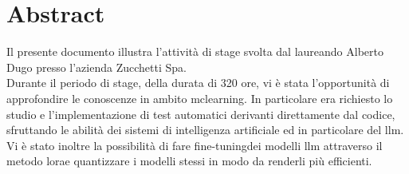 \cleardoublepage
{}
{}
\begingroup
\let\clearpage\relax
\let\cleardoublepage\relax
\chapter*{Abstract}
Il presente documento illustra l'attività di stage svolta dal laureando Alberto Dugo presso l'azienda Zucchetti Spa.
\\Durante il periodo di stage, della durata di 320 ore, vi è stata l'opportunità di approfondire le conoscenze in ambito \gls{mclearning}\glox.
In particolare era richiesto lo studio e l'implementazione di test automatici derivanti direttamente dal codice, sfruttando le abilità dei sistemi di intelligenza artificiale ed in particolare del \gls{llm}\glox\gloxspacing.
Vi è stato inoltre la possibilità di fare \gls{fine-tuning}\glox dei modelli \gls{llm} attraverso il metodo \gls{lora}\glox e quantizzare i modelli stessi in modo da renderli più efficienti.
\endgroup
\vfill
